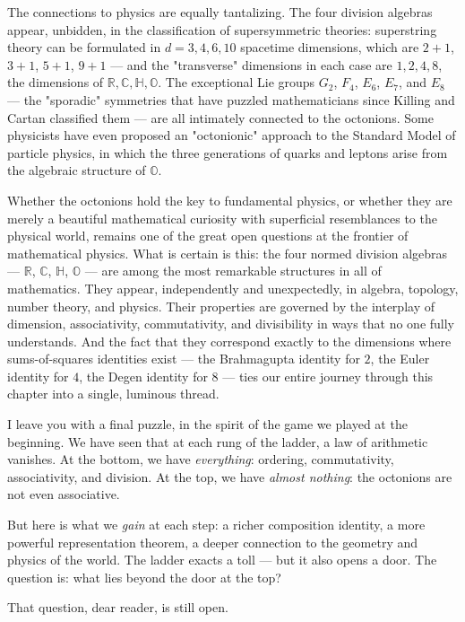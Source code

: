 The connections to physics are equally tantalizing. The four division algebras appear, unbidden, in the classification of supersymmetric theories: superstring theory can be formulated in $d = 3, 4, 6, 10$ spacetime dimensions, which are $2 + 1$, $3 + 1$, $5 + 1$, $9 + 1$ --- and the "transverse" dimensions in each case are $1, 2, 4, 8$, the dimensions of $\mathbb{R}, \mathbb{C}, \mathbb{H}, \mathbb{O}$. The exceptional Lie groups $G_2$, $F_4$, $E_6$, $E_7$, and $E_8$ --- the "sporadic" symmetries that have puzzled mathematicians since Killing and Cartan classified them --- are all intimately connected to the octonions. Some physicists have even proposed an "octonionic" approach to the Standard Model of particle physics, in which the three generations of quarks and leptons arise from the algebraic structure of $\mathbb{O}$.


Whether the octonions hold the key to fundamental physics, or whether they are merely a beautiful mathematical curiosity with superficial resemblances to the physical world, remains one of the great open questions at the frontier of mathematical physics. What is certain is this: the four normed division algebras --- $\mathbb{R}$, $\mathbb{C}$, $\mathbb{H}$, $\mathbb{O}$ --- are among the most remarkable structures in all of mathematics. They appear, independently and unexpectedly, in algebra, topology, number theory, and physics. Their properties are governed by the interplay of dimension, associativity, commutativity, and divisibility in ways that no one fully understands. And the fact that they correspond exactly to the dimensions where sums-of-squares identities exist --- the Brahmagupta identity for $2$, the Euler identity for $4$, the Degen identity for $8$ --- ties our entire journey through this chapter into a single, luminous thread.

I leave you with a final puzzle, in the spirit of the game we played at the beginning. We have seen that at each rung of the ladder, a law of arithmetic vanishes. At the bottom, we have \textit{everything}: ordering, commutativity, associativity, and division. At the top, we have \textit{almost nothing}: the octonions are not even associative.

But here is what we \textit{gain} at each step: a richer composition identity, a more powerful representation theorem, a deeper connection to the geometry and physics of the world. The ladder exacts a toll --- but it also opens a door. The question is: what lies beyond the door at the top?

That question, dear reader, is still open.


